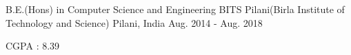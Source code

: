 

\begin{cventries}

  \cventry
    {B.E.(Hons) in Computer Science and Engineering} %
    {BITS Pilani(Birla Institute of Technology and Science)} %
    {Pilani, India} %
    {Aug. 2014 - Aug. 2018} %
    {
      \begin{cvitems} %
        \item {CGPA : 8.39}
      \end{cvitems}
    }
\iffalse
\cventry
    {} %
    {Amity International School, Mayur Vihar} %
    {Delhi, India} %
    {Mar. 2000 - Mar. 2014} %
    {
      \begin{cvitems} %
        \item {XII : 93.8\%}
        \item {X : 10.0}
      \end{cvitems}
    }
\fi
\end{cventries}
